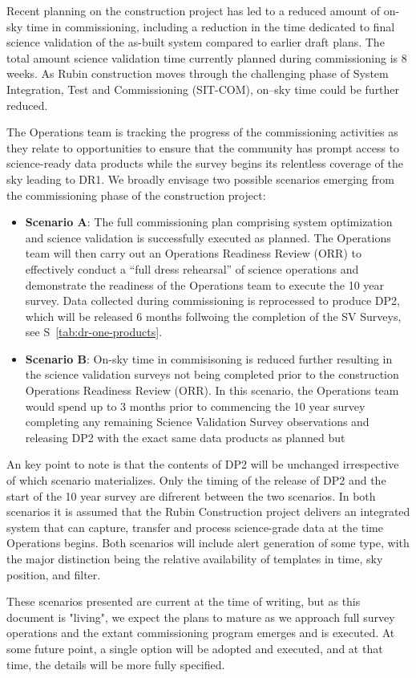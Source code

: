 Recent planning on the construction project has led to a reduced amount of on-sky time in commissioning, including a reduction in the time dedicated to final science validation of the as-built system compared to earlier draft plans.
The total amount science validation time currently planned during commissioning is 8 weeks. 
As Rubin construction moves through the challenging phase of System Integration, Test and Commissioning (SIT-COM), on--sky time could be further reduced.

The Operations team is tracking the progress of the commissioning activities as they relate to \es opportunities to ensure that the community has prompt access to science-ready data products while the survey begins its relentless coverage of the sky leading to DR1.
We broadly envisage two possible scenarios emerging from the commissioning phase of the construction project: 

\begin{itemize}
\item \textbf{Scenario A}:
The full commissioning plan comprising system optimization and science validation is successfully executed as planned. 
The Operations team will then carry out an Operations Readiness Review (ORR) to effectively conduct a “full dress rehearsal” of science operations and demonstrate the readiness of the Operations team to execute the 10 year survey. 
Data collected during commissioning is reprocessed to produce DP2, which will be released 6 months follwoing the completion of the SV Surveys, see S~\ref{tab:dr-one-products}.

\item \textbf{Scenario B}:
On-sky time in commisisoning is reduced further resulting in the science validation surveys not being completed prior to the construction Operations Readiness Review (ORR). 
In this scenario, the Operations team would spend up to 3 months prior to commencing the 10 year survey completing any remaining Science Validation Survey observations and releasing DP2 with the exact same data products as planned but 

\end{itemize}

An key point to note is that the contents of DP2 will be unchanged irrespective of which scenario materializes.  
Only the timing of the release of DP2 and the start of the 10 year survey are difrerent between the two scenarios. 
In both scenarios it is assumed that the Rubin Construction project delivers an integrated system that can capture, transfer and process science-grade data at the time Operations begins.
Both scenarios will include alert generation of some type, with the major distinction being the relative availability of templates in time, sky position, and filter.




These scenarios presented are current at the time of writing, but as this document is "living", we expect the plans to mature as we approach full survey operations and the extant commissioning program emerges and is executed.
At some future point, a single option will be adopted and executed, and at that time, the details will be more fully specified.
